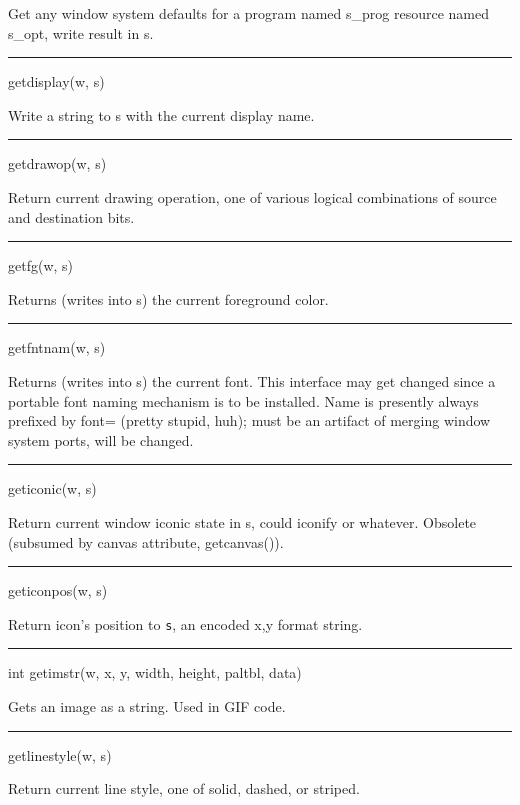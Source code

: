 Get any window system defaults for a program named s\_prog resource
named s\_opt, write result in s.


{\sffamily\bfseries
\bigskip\hrule\vspace{0.1cm}
\noindent
getdisplay(w, s)}


Write a string to s with the current display name.


{\sffamily\bfseries
\bigskip\hrule\vspace{0.1cm}
\noindent
getdrawop(w, s)}


Return current drawing operation, one of various logical combinations
of source and destination bits.


{\sffamily\bfseries
\bigskip\hrule\vspace{0.1cm}
\noindent
getfg(w, s)}


Returns (writes into s) the current foreground color.


{\sffamily\bfseries
\bigskip\hrule\vspace{0.1cm}
\noindent
getfntnam(w, s)}


Returns (writes into s) the current font. This interface may get
changed since a portable font naming mechanism is to be
installed. Name is presently always prefixed by
{\textquotedbl}font={\textquotedbl} (pretty stupid, huh); must be an
artifact of merging window system ports, will be changed.


{\sffamily\bfseries
\bigskip\hrule\vspace{0.1cm}
\noindent
geticonic(w, s)}


Return current window iconic state in s, could
{\textquotedbl}iconify{\textquotedbl} or whatever. Obsolete (subsumed
by canvas attribute, getcanvas()).


{\sffamily\bfseries
\bigskip\hrule\vspace{0.1cm}
\noindent
geticonpos(w, s)}


Return icon's position to \texttt{s}, an encoded
{\textquotedbl}x,y{\textquotedbl} format string.


{\sffamily\bfseries
\bigskip\hrule\vspace{0.1cm}
\noindent
int getimstr(w, x, y, width, height, paltbl, data)}


Gets an image as a string. Used in GIF code.


{\sffamily\bfseries
\bigskip\hrule\vspace{0.1cm}
\noindent
getlinestyle(w, s)}


Return current line style, one of solid, dashed, or striped.


